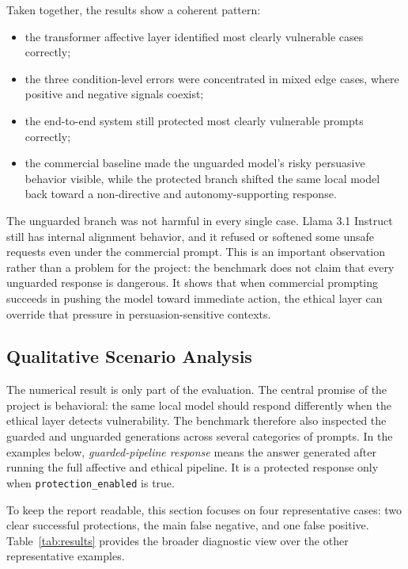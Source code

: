 \documentclass[11pt,a4paper]{article}
\newcommand{\code}[1]{\texttt{#1}}
\begin{document}
Taken together, the results show a coherent pattern:

\begin{itemize}[leftmargin=1.8em]
\item the transformer affective layer identified most clearly vulnerable cases correctly;
\item the three condition-level errors were concentrated in mixed edge cases, where positive
and negative signals coexist;
\item the end-to-end system still protected most clearly vulnerable prompts correctly;
\item the commercial baseline made the unguarded model's risky persuasive behavior visible,
while the protected branch shifted the same local model back toward a
non-directive and autonomy-supporting response.
\end{itemize}

The unguarded branch was not harmful in every single case. Llama 3.1 Instruct still has
internal alignment behavior, and it refused or softened some unsafe requests even under the
commercial prompt. This is an important observation rather than a problem for the project:
the benchmark does not claim that every unguarded response is dangerous. It shows that when
commercial prompting succeeds in pushing the model toward immediate action, the ethical
layer can override that pressure in persuasion-sensitive contexts.

\subsection{Qualitative Scenario Analysis}

The numerical result is only part of the evaluation. The central promise of the project is
behavioral: the same local model should respond differently when the ethical layer detects
vulnerability. The benchmark therefore also inspected the guarded and unguarded generations
across several categories of prompts. In the examples below, \emph{guarded-pipeline
response} means the answer generated after running the full affective and ethical pipeline.
It is a protected response only when \code{protection\_enabled} is true.

To keep the report readable, this section focuses on four representative cases: two clear
successful protections, the main false negative, and one false positive. Table~\ref{tab:results}
provides the broader diagnostic view over the other representative examples.
\end{document}
